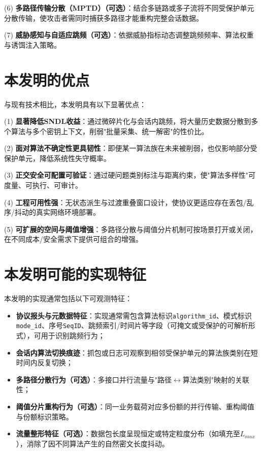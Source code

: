 \documentclass[12pt,a4paper]{article}
\begin{document}
(6) \textbf{多路径传输分散（MPTD）（可选）}：结合多链路或多子流将不同受保护单元分散传输，使攻击者需同时捕获多路径才能重构完整会话数据。

(7) \textbf{威胁感知与自适应跳频（可选）}：依据威胁指标动态调整跳频频率、算法权重与诱饵注入策略。

\section{本发明的优点}

与现有技术相比，本发明具有以下显著优点：

(1) \textbf{显著降低SNDL收益}：通过微碎片化与会话内跳频，将大量历史数据分散到多个算法与多个密钥上下文，削弱"批量采集、统一解密"的性价比。

(2) \textbf{面对算法不确定性更具韧性}：即便某一算法族在未来被削弱，也仅影响部分受保护单元，降低系统性失守概率。

(3) \textbf{正交安全可配置可验证}：通过硬问题类别标注与距离约束，使"算法多样性"可度量、可执行、可审计。

(4) \textbf{工程可用性强}：无状态派生与过渡重叠窗口设计，使协议更适应存在丢包/乱序/抖动的真实网络环境部署。

(5) \textbf{可扩展的空间与阈值增强}：多路径分散与阈值分片机制可按场景打开或关闭，在不同成本/安全需求下提供可组合的增强。

\section{本发明可能的实现特征}

本发明的实现通常包括以下可观测特征：

\begin{itemize}
    \item \textbf{协议报头与元数据特征}：实现通常需包含算法标识\texttt{algorithm\_id}、模式标识\texttt{mode\_id}、序号\texttt{SeqID}、跳频索引/时间片等字段（可掩文或受保护的可解析形式），可用于识别跳频行为；
    \item \textbf{会话内算法切换痕迹}：抓包或日志可观察到相邻受保护单元的算法族类别在短时间内反复切换；
    \item \textbf{多路径分散行为（可选）}：多接口并行流量与"路径$\leftrightarrow$算法类别"映射的关联性；
    \item \textbf{阈值分片重构行为（可选）}：同一业务载荷对应多份额的并行传输、重构阈值与份额标识策略。
    \item \textbf{流量整形特征（可选）}：数据包长度呈现恒定或特定粒度分布（如填充至$L_{max}$），消除了因不同算法产生的自然密文长度抖动。
\end{itemize}
\end{document}
